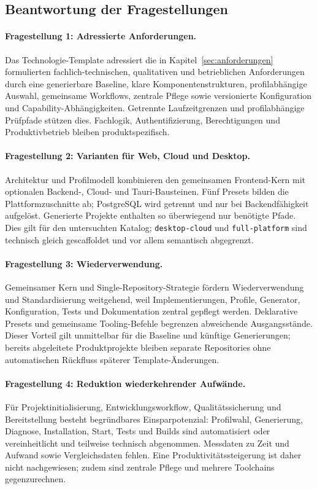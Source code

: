 \subsection{Beantwortung der Fragestellungen}
\label{subsec:beantwortung-fragestellungen}

\paragraph{Fragestellung 1: Adressierte Anforderungen.}
Das Technologie-Template adressiert die in Kapitel~\ref{sec:anforderungen}
formulierten fachlich-technischen, qualitativen und betrieblichen Anforderungen
durch eine generierbare Baseline, klare Komponentenstrukturen,
profilabhängige Auswahl, gemeinsame Workflows, zentrale Pflege sowie
versionierte Konfiguration und Capability-Abhängigkeiten. Getrennte
Laufzeitgrenzen und profilabhängige Prüfpfade stützen dies. Fachlogik,
Authentifizierung, Berechtigungen und Produktivbetrieb bleiben
produktspezifisch.

\paragraph{Fragestellung 2: Varianten für Web, Cloud und Desktop.}
Architektur und Profilmodell kombinieren den gemeinsamen Frontend-Kern mit
optionalen Backend-, Cloud- und Tauri-Bausteinen. Fünf Presets bilden die
Plattformzuschnitte ab; PostgreSQL wird getrennt und nur bei Backendfähigkeit
aufgelöst. Generierte Projekte enthalten so überwiegend nur benötigte Pfade.
Dies gilt für den untersuchten Katalog; \texttt{desktop-cloud} und
\texttt{full-platform} sind technisch gleich gescaffoldet und vor allem
semantisch abgegrenzt.

\paragraph{Fragestellung 3: Wiederverwendung.}
Gemeinsamer Kern und Single-Repository-Strategie fördern Wiederverwendung und
Standardisierung weitgehend, weil Implementierungen, Profile, Generator,
Konfiguration, Tests und Dokumentation zentral gepflegt werden. Deklarative
Presets und gemeinsame Tooling-Befehle begrenzen abweichende Ausgangsstände.
Dieser Vorteil gilt unmittelbar für die Baseline und künftige Generierungen;
bereits abgeleitete Produktprojekte bleiben separate Repositories ohne
automatischen Rückfluss späterer Template-Änderungen.

\paragraph{Fragestellung 4: Reduktion wiederkehrender Aufwände.}
Für Projektinitialisierung, Entwicklungsworkflow, Qualitätssicherung und
Bereitstellung besteht begründbares Einsparpotenzial: Profilwahl, Generierung,
Diagnose, Installation, Start, Tests und Builds sind automatisiert oder
vereinheitlicht und teilweise technisch abgenommen. Messdaten zu Zeit und
Aufwand sowie Vergleichsdaten fehlen. Eine Produktivitätssteigerung ist daher
nicht nachgewiesen; zudem sind zentrale Pflege und mehrere Toolchains
gegenzurechnen.

